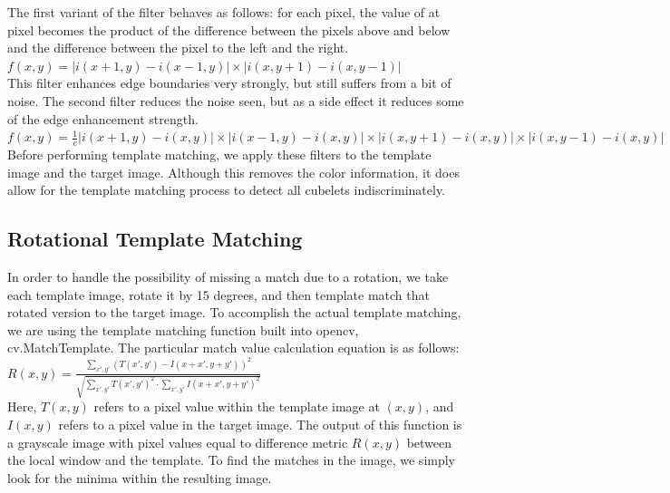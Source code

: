 \documentclass[conference]{IEEEtran}
\begin{document}
The first variant of the filter behaves as follows: for each pixel, the value of at pixel becomes the product of the difference between the pixels above and below and the difference between the pixel to the left and the right.
\\[6pt]
\begin{math} 
	f(x,y) = |i(x+1,y) - i(x-1,y)|  \times |i(x,y+1) - i(x,y-1)| 
\end{math} 
\\[6pt]
This filter enhances edge boundaries very strongly, but still suffers from a bit of noise. The second filter reduces the noise seen, but as a side effect it reduces some of the edge enhancement strength. 
\\[6pt]
\begin{math} 
	f(x,y) = \frac{1}{c} |i(x+1,y) - i(x,y)|  \times |i(x-1,y) - i(x,y)| \times |i(x,y+1) - i(x,y)| \times |i(x,y-1) - i(x,y)| 
\end{math} 
\\[6pt]

Before performing template matching, we apply these filters to the template image and the target image.  Although this removes the  color information, it does allow for the template matching process to detect all cubelets indiscriminately. 

\subsection{Rotational Template Matching}
In order to handle the possibility of missing a match due to a rotation, we take each template image, rotate it by 15 degrees, and then template match that rotated version to the target image.  To accomplish the actual template matching, we are using the template matching function built into opencv, cv.MatchTemplate. The particular match value calculation equation is as follows: 
\\[6pt]
\begin{math} 
	R(x,y) = \frac{\sum_{x',y'}(T(x',y')-I(x+x',y+y'))^{2}}{\sqrt{\sum_{x',y'}T(x',y')^{2}\cdot \sum_{x',y'}I(x+x',y+y')^{2} }}
\end{math} 
\\[6pt]
Here, $T(x,y)$ refers to a pixel value within the template image at $(x,y)$, and $I(x,y)$ refers to a pixel value in the target image. The output of this function is a grayscale image with pixel values equal to difference metric $R(x,y)$ between the local window and the template.  To find the matches in the image, we simply look for the minima within the resulting image.
\end{document}
